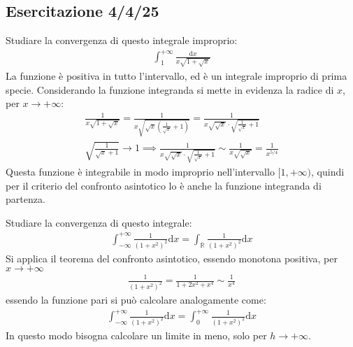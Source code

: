 \documentclass{article}
\newcommand{\df}{\mathrm{d}}
\newcommand{\intab}[4]{\displaystyle\int_{#1}^{#2}{#3}\df{#4}}
\newcommand{\intinf}[2]{\intab{-\infty}{+\infty}{#1}{#2}}
\newcommand{\intpinf}[2]{\intab{0}{+\infty}{#1}{#2}}
\numberwithin{equation}{subsection}
\begin{document}
\subsection{Esercitazione 4/4/25}

Studiare la convergenza di questo integrale improprio:
\begin{gather*}
    \displaystyle\int_1^{+\infty}\frac{\df x}{x\sqrt{1+\sqrt{x}}}
\end{gather*}
La funzione è positiva in tutto l'intervallo, ed è un integrale improprio di prima specie. Considerando la funzione integranda si mette in evidenza la radice di $x$, per $x\to+\infty$:
\begin{gather*}
    \displaystyle\frac{1}{x\sqrt{1+\sqrt{x}}}=\frac{1}{x\sqrt{\sqrt{x}\left(\frac{1}{\sqrt{x}}+1\right)}}=
    \frac{1}{x\sqrt{\sqrt{x}}\cdot\sqrt{\frac{1}{\sqrt{x}}+1}}\\
    \displaystyle\sqrt{\frac{1}{\sqrt{x}+1}}\to1\implies
    \frac{1}{x\sqrt{\sqrt{x}}\cdot\sqrt{\frac{1}{\sqrt{x}}+1}}\sim
    \frac{1}{x\sqrt{\sqrt{x}}}=\frac{1}{x^{5/4}}
\end{gather*}
Questa funzione è integrabile in modo improprio nell'intervallo $[1,+\infty)$, quindi per il criterio del confronto asintotico lo è anche la funzione integranda di partenza. 


Studiare la convergenza di questo integrale:
\begin{gather*}
    \intinf{\frac{1}{(1+x^2)^2}}{x}
    =\int_{\mathbb{R}}\frac{1}{(1+x^2)^2}\df x
\end{gather*}
Si applica il teorema del confronto asintotico, essendo monotona positiva, per $x\to+\infty$
\begin{gather*}
    \frac{1}{(1+x^2)^2}=
    \frac{1}{1+2x^2+x^4}\sim\frac{1}{x^4}
\end{gather*}
essendo la funzione pari si può calcolare analogamente come:
\begin{gather*}
    \intinf{\frac{1}{(1+x^2)^2}}{x}=
    \intpinf{\frac{1}{(1+x^2)^2}}{x}
\end{gather*}
In questo modo bisogna calcolare un limite in meno, solo per $h\to+\infty$. 
\end{document}
